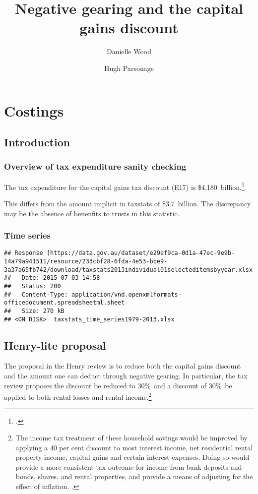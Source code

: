\documentclass{grattan}\usepackage[]{graphicx}\usepackage[]{color}
\title{Negative gearing and the capital gains discount}
\author{Danielle Wood \and Hugh Parsonage}
\makeatletter
\newenvironment{kframe}{%
 \def\at@end@of@kframe{}%
 \ifinner\ifhmode%
  \def\at@end@of@kframe{\end{minipage}}%
  \begin{minipage}{\columnwidth}%
 \fi\fi%
 \def\FrameCommand##1{\hskip\@totalleftmargin \hskip-\fboxsep
 \colorbox{shadecolor}{##1}\hskip-\fboxsep
     \hskip-\linewidth \hskip-\@totalleftmargin \hskip\columnwidth}%
 \MakeFramed {\advance\hsize-\width
   \@totalleftmargin\z@ \linewidth\hsize
   \@setminipage}}%
 {\par\unskip\endMakeFramed%
 \at@end@of@kframe}
\newenvironment{knitrout}{}{} %
\makeatother
\begin{document}
\clearpage





\raggedbottom
\contentspage
\listoffigures
\listoftables

\chapter{Costings}
\section{Introduction}
\subsection{Overview of tax expenditure sanity checking}
The tax expenditure for the capital gains tax discount (E17) is \$4,180~billion.\footcite{TaxExpenditures201213} 


This differs from the amount implicit in taxstats of \$3.7~billion. The discrepancy may be the absence of benenfits to trusts in this statistic. 

\subsection{Time series}
\begin{knitrout}
\color{fgcolor}\begin{kframe}
\begin{verbatim}
## Response [https://data.gov.au/dataset/e29ef9ca-0d1a-47ec-9e9b-14a79a941511/resource/233cbf28-6fda-4e53-bbe9-3a37a65fb742/download/taxstats2013individual01selecteditemsbyyear.xlsx]
##   Date: 2015-07-03 14:58
##   Status: 200
##   Content-Type: application/vnd.openxmlformats-officedocument.spreadsheetml.sheet
##   Size: 270 kB
## <ON DISK>  taxstats_time_series1979-2013.xlsx
\end{verbatim}
\end{kframe}
\end{knitrout}

\section{Henry-lite proposal}
The proposal in the Henry review is to reduce both the capital gains discount and the amount one can deduct through negative gearing. In particular, the tax review proposes the discount be reduced to 30\%\ and a discount of 30\%\ be applied to both rental losses and rental income.\footnote{The income tax treatment of these household savings would be improved by applying a
40 per cent discount to most interest income, net residential rental property income, capital
gains and certain interest expenses. Doing so would provide a more consistent tax
outcome for income from bank deposits and bonds, shares, and rental properties, and
provide a means of adjusting for the effect of inflation. \textcite{Treasury2010a}.}
\end{document}
